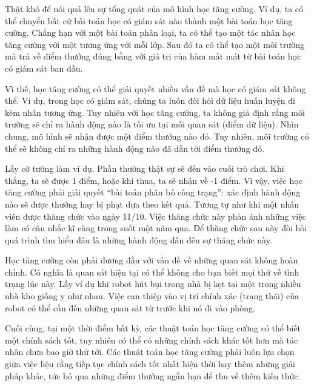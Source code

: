 \documentclass[letterpaper,11pt,english]{sphinxmanual}
\begin{document}
Thật khó để nói quá lên sự tổng quát của mô hình học tăng cường. Ví dụ,
ta có thể chuyển bất cứ bài toán học có giám sát nào thành một bài toán
học tăng cường. Chẳng hạn với một bài toán phân loại, ta có thể tạo một
tác nhân học tăng cường với một  tương ứng với mỗi lớp. Sau
đó ta có thể tạo một môi trường mà trả về điểm thưởng đúng bằng với giá
trị của hàm mất mát từ bài toán học có giám sát ban đầu.







Vì thế, học tăng cường có thể giải quyết nhiều vấn đề mà học có giám sát
không thể. Ví dụ, trong học có giám sát, chúng ta luôn đòi hỏi dữ liệu
huấn luyện đi kèm nhãn tương ứng. Tuy nhiên với học tăng cường, ta không
giả định rằng môi trường sẽ chỉ ra hành động nào là tối ưu tại mỗi quan
sát (điểm dữ liệu). Nhìn chung, mô hình sẽ nhận được một điểm thưởng nào
đó. Tuy nhiên, môi trường có thể sẽ không chỉ ra những hành động nào đã
dẫn tới điểm thưởng đó.



Lấy cờ tướng làm ví dụ. Phần thưởng thật sự sẽ đến vào cuối trò chơi.
Khi thắng, ta sẽ được 1 điểm, hoặc khi thua, ta sẽ nhận về -1 điểm. Vì
vậy, việc học tăng cường phải giải quyết “bài toán phân bố công trạng”:
xác định hành động nào sẽ được thưởng hay bị phạt dựa theo kết quả.
Tương tự như khi một nhân viên được thăng chức vào ngày 11/10. Việc
thăng chức này phản ánh những việc làm có cân nhắc kĩ càng trong suốt
một năm qua. Để thăng chức sau này đòi hỏi quá trình tìm hiểu đâu là
những hành động dẫn đến sự thăng chức này.



Học tăng cường còn phải đương đầu với vấn đề về những quan sát không
hoàn chỉnh. Có nghĩa là quan sát hiện tại có thể không cho bạn biết mọi
thứ về tình trạng lúc này. Lấy ví dụ khi robot hút bụi trong nhà bị kẹt
tại một trong nhiều nhà kho giống y như nhau. Việc can thiệp vào vị trí
chính xác (trạng thái) của robot có thể cần đến những quan sát từ trước
khi nó đi vào phòng.



Cuối cùng, tại một thời điểm bất kỳ, các thuật toán học tăng cường có
thể biết một chính sách tốt, tuy nhiên có thể có những chính sách khác
tốt hơn mà tác nhân chưa bao giờ thử tới. Các thuật toán học tăng cường
phải luôn lựa chọn giữa việc liệu rằng tiếp tục  chính sách
tốt nhất hiện thời hay  thêm những giải pháp khác, tức bỏ qua
những điểm thưởng ngắn hạn để thu về thêm kiến thức.
\end{document}
